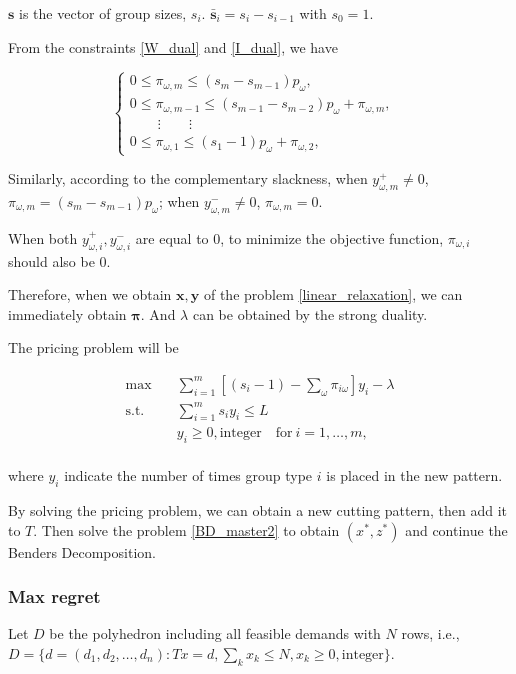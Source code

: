 $\mathbf{s}$ is the vector of group sizes, $s_i$. $\mathbf{\bar{s}}_{i} = s_i - s_{i-1}$ with $s_0 =1$.


From the constraints \eqref{W_dual} and \eqref{I_dual}, we have 

\begin{equation}
  \left\{
    \begin{array}{lr}
    0 \leq \pi_{\omega,m} \leq (s_m -s_{m-1})p_{\omega}, &  \\
    0 \leq \pi_{\omega, m-1} \leq (s_{m-1} -s_{m-2})p_{\omega}+ \pi_{\omega,m}, &  \\
    \qquad \vdots \qquad \vdots &  \\
    0 \leq \pi_{\omega,1} \leq (s_{1} - 1)p_{\omega}+ \pi_{\omega,2}, &
    \end{array}
  \right.
\end{equation}

Similarly, according to the complementary slackness,
when $y_{\omega,m}^{+} \neq 0$, $\pi_{\omega,m} = (s_m -s_{m-1})p_{\omega}$; when $y_{\omega,m}^{-} \neq 0$, $\pi_{\omega,m} = 0$. 

When both $y_{\omega,i}^{+}, y_{\omega,i}^{-}$ are equal to 0, to minimize the objective function, $\pi_{\omega,i}$ should also be 0.

Therefore, when we obtain $\mathbf{x},\mathbf{y}$ of the problem \eqref{linear_relaxation}, we can immediately obtain $\mathbf{\pi}$. And $\lambda$ can be obtained by the strong duality.

The pricing problem will be

\[\begin{split}\mbox{max}\quad & \sum_{i=1}^m \left[(s_i-1) -\sum_{\omega}\pi_{i \omega}\right] y_{i} - \lambda \\
  \mbox{s.t.} \quad & \sum_{i=1}^m s_i y_i \leq L  \\
  & y_i \geq 0, \mbox{integer}\quad \mbox{for}~ i=1,\ldots,m,\\
\end{split}\]

where $y_i$ indicate the number of times group type $i$ is placed in the new pattern.

By solving the pricing problem, we can obtain a new cutting pattern, then add it to $T$. Then solve the problem \eqref{BD_master2} to obtain $(x^{*}, z^{*})$ and continue the Benders Decomposition.

\subsubsection{Max regret}
Let $D$ be the polyhedron including all feasible demands with $N$ rows, i.e., 
$D = \{d = (d_1,d_2,\ldots, d_n): Tx = d,\sum_{k} x_k \leq N, x_k \geq 0, \mbox{integer} \}$.

